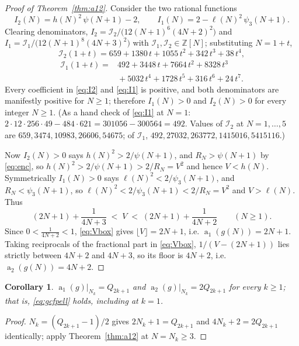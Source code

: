 \documentclass[11pt]{amsart}
\newtheorem{corollary}[theorem]{Corollary}
\theoremstyle{definition}
\theoremstyle{remark}
\DeclareMathOperator{\PQ}{a}
\newcommand{\Rt}{R}
\newcommand{\ps}{\psi}
\newcommand{\pss}{\psi_3}
\begin{document}
\begin{proof}[Proof of Theorem~\ref{thm:a12}]
Consider the two rational functions
\[
 I_2(N)=h(N)^2\,\ps(N+1)-2,
 \qquad
 I_1(N)=2-\ell(N)^2\,\pss(N+1).
\]
Clearing denominators, $I_2=\mathcal I_2/\bigl(12(N+1)^6(4N+2)^2\bigr)$ and
$I_1=\mathcal I_1/\bigl(12(N+1)^8(4N+3)^2\bigr)$ with
$\mathcal I_1,\mathcal I_2\in\mathbb Z[N]$; substituting $N=1+t$,
\begin{equation}\label{eq:I2}
 \mathcal I_2(1+t)=659+1380\,t+1055\,t^2+342\,t^3+38\,t^4,
\end{equation}
\begin{equation}\label{eq:I1}
\begin{aligned}
 \mathcal I_1(1+t)={}&492+3448\,t+7664\,t^2+8328\,t^3\\
 &{}+5032\,t^4+1728\,t^5+316\,t^6+24\,t^7 .
\end{aligned}
\end{equation}
Every coefficient in \eqref{eq:I2} and \eqref{eq:I1} is positive, and both
denominators are manifestly positive for $N\ge1$; therefore
$I_1(N)>0$ and $I_2(N)>0$ for every integer $N\ge1$. (As a hand check
of \eqref{eq:I1} at $N=1$: $2\cdot12\cdot256\cdot49-484\cdot621=301056-300564=492$.
Values of $\mathcal I_2$ at $N=1,\dots,5$ are $659,3474,10983,26606,54675$; of
$\mathcal I_1$, $492,27032,263772,1415016,5415116$.)

Now $I_2(N)>0$ says $h(N)^2>2/\ps(N+1)$, and $\Rt_N>\ps(N+1)$ by
\eqref{eq:enc}, so $h(N)^2>2/\ps(N+1)>2/\Rt_N=V^2$ and hence $V<h(N)$.
Symmetrically $I_1(N)>0$ says $\ell(N)^2<2/\pss(N+1)$, and
$\Rt_N<\pss(N+1)$, so $\ell(N)^2<2/\pss(N+1)<2/\Rt_N=V^2$ and $V>\ell(N)$.
Thus
\begin{equation}\label{eq:Vbox}
 (2N+1)+\frac1{4N+3}\;<\;V\;<\;(2N+1)+\frac1{4N+2}
 \qquad(N\ge1).
\end{equation}
Since $0<\tfrac1{4N+2}<1$, \eqref{eq:Vbox} gives $\lfloor V\rfloor=2N+1$, i.e.
$\PQ_1(g(N))=2N+1$. Taking reciprocals of the fractional part in
\eqref{eq:Vbox}, $1/(V-(2N+1))$ lies strictly between $4N+2$ and $4N+3$, so its
floor is $4N+2$, i.e. $\PQ_2(g(N))=4N+2$.
\end{proof}

\begin{corollary}\label{cor:pell}
$\PQ_1(g)|_{N_k}=Q_{2k+1}$ and $\PQ_2(g)|_{N_k}=2Q_{2k+1}$ for every $k\ge1$;
that is, \eqref{eq:gcfpell} holds, including at $k=1$.
\end{corollary}

\begin{proof}
$N_k=(Q_{2k+1}-1)/2$ gives $2N_k+1=Q_{2k+1}$ and $4N_k+2=2Q_{2k+1}$
identically; apply Theorem~\ref{thm:a12} at $N=N_k\ge3$.
\end{proof}
\end{document}
